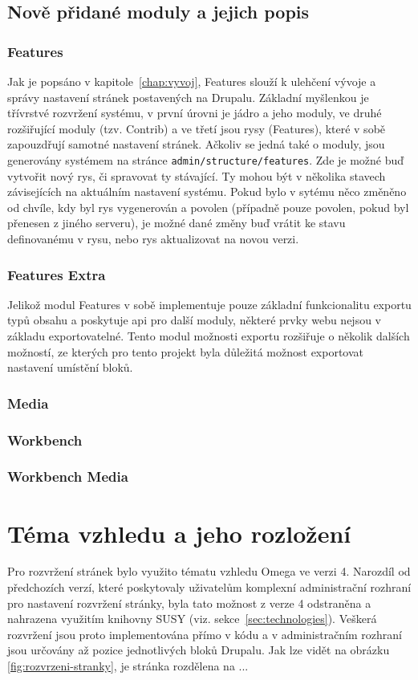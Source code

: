 \subsection{Nově přidané moduly a jejich popis}

\subsubsection*{Features} 
Jak je popsáno v kapitole~\ref{chap:vyvoj}, Features slouží k ulehčení vývoje a správy nastavení stránek postavených na Drupalu. Základní myšlenkou je třívrstvé rozvržení systému, v první úrovni je jádro a jeho moduly, ve druhé rozšiřující moduly (tzv. Contrib) a ve třetí jsou rysy (Features), které v sobě zapouzdřují samotné nastavení stránek. Ačkoliv se jedná také o moduly, jsou generovány systémem na stránce \texttt{admin/structure/features}. Zde je možné buď vytvořit nový rys, či spravovat ty stávající. Ty mohou být v několika stavech závisejících na aktuálním nastavení systému. Pokud bylo v sytému něco změněno od chvíle, kdy byl rys vygenerován a povolen (případně pouze povolen, pokud byl přenesen z jiného serveru), je možné dané změny buď vrátit ke stavu definovanému v rysu, nebo rys aktualizovat na novou verzi.

\subsubsection*{Features Extra}
Jelikož modul Features v sobě implementuje pouze základní funkcionalitu exportu typů obsahu a poskytuje \gls{api} pro další moduly, některé prvky webu nejsou v základu exportovatelné. Tento modul možnosti exportu rozšiřuje o několik dalších možností, ze kterých pro tento projekt byla důležitá možnost exportovat nastavení umístění bloků.

\subsubsection*{Media}


\subsubsection*{Workbench}
\subsubsection*{Workbench Media}

\section{Téma vzhledu a jeho rozložení}
Pro rozvržení stránek bylo využito tématu vzhledu Omega ve verzi 4. Narozdíl od předchozích verzí, které poskytovaly uživatelům komplexní administrační rozhraní pro nastavení rozvržení stránky, byla tato možnost z verze 4 odstraněna a nahrazena využitím knihovny SUSY (viz. sekce~\ref{sec:technologies}). Veškerá rozvržení jsou proto implementována přímo v kódu a v administračním rozhraní jsou určovány až pozice jednotlivých bloků Drupalu. 
Jak lze vidět na obrázku \ref{fig:rozvrzeni-stranky}, je stránka rozdělena na ...

